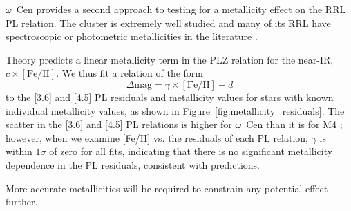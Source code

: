 \documentclass[a4paper,fleqn,usenatbib]{mnras}
\begin{document}
$\omega$~Cen provides a second approach to testing for a metallicity effect on the RRL PL relation. The cluster is extremely well studied and many of its RRL have spectroscopic or photometric metallicities in the literature \citep[e.g.][]{2006ApJ...640L..43S, 2000AJ....119.1824R}. 

Theory predicts a linear metallicity term in the PLZ relation for the near-IR, $c\times[\text{Fe/H}]$.
We thus fit a relation of the form
\begin{equation}
\Delta\text{mag} = \gamma \times[\text{Fe/H}] + d
\end{equation}
to the [3.6] and [4.5] PL residuals and metallicity values for stars with known individual metallicity values, as shown in Figure~\ref{fig:metallicity_residuals}. The scatter in the [3.6] and [4.5] PL relations is higher for $\omega$~Cen than it is for M4 \citep{2015ApJ...808...11N, 2015ApJ...799..165B}; however, when we examine [Fe/H] vs. the residuals of each PL relation, $\gamma$ is within $1\sigma$ of zero for all fits, indicating that there is no significant metallicity dependence in the PL residuals, consistent with predictions.


More accurate metallicities will be required to constrain any potential effect further.
\end{document}
